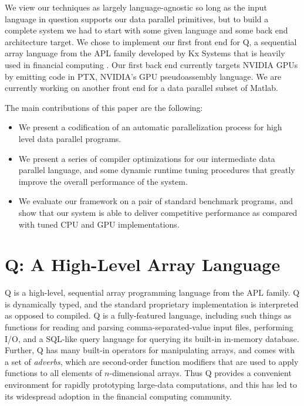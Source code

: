 \documentclass[preprint]{sigplanconf}
\begin{document}
We view our techniques as largely language-agnostic so long as the input
language in question supports our data parallel primitives, but to build a
complete system we had to start with some given language and some back end
architecture target.  We chose to implement our first front end for Q, a
sequential array language from the APL family developed by Kx Systems that is
heavily used in financial computing \cite{Borr08}.  Our first back end currently
targets NVIDIA GPUs by emitting code in PTX, NVIDIA's GPU pseudoassembly
language.  We are currently working on another front end for a data parallel
subset of Matlab.

The main contributions of this paper are the following:

\begin{itemize}
\item We present a codification of an automatic parallelization process for
high level data parallel programs.
\item We present a series of compiler optimizations for our intermediate data
parallel language, and some dynamic runtime tuning procedures that greatly
improve the overall performance of the system.
\item We evaluate our framework on a pair of standard benchmark programs, and
show that our system is able to deliver competitive performance as compared
with tuned CPU and GPU implementations.
\end{itemize}

\section{Q: A High-Level Array Language}
\label{Q}

Q is a high-level, sequential array programming language from the APL family.  Q is dynamically typed, and the standard proprietary implementation is interpreted as opposed to compiled.  Q is a fully-featured language, including such things as functions for reading and parsing comma-separated-value input files, performing I/O, and a SQL-like query language for querying its built-in in-memory database.  Further, Q has many built-in operators for manipulating arrays, and comes with a set of {\it adverbs}, which are second-order function modifiers that are used to apply functions to all elements of $n$-dimensional arrays.  Thus Q provides a convenient environment for rapidly prototyping large-data computations, and this has led to its widespread adoption in the financial computing community.
\end{document}
